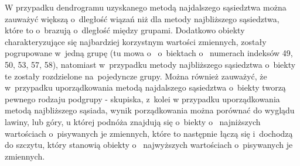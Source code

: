 \documentclass[12pt,a4paper]{report}
\begin{document}
{W przypadku dendrogramu uzyskanego metodą najdalszego sąsiedztwa można
zauważyć większą o~dległość wiązań niż dla metody najbliższego
sąsiedztwa, które to o~brazują o~dległość między grupami. Dodatkowo
obiekty charakteryzujące się najbardziej korzystnym wartości zmiennych,
zostały pogrupowane w~jedną grupę (tu mowa o~ o~biektach o~ numerach
indeksów 49, 50, 53, 57, 58), natomiast w~przypadku metody najbliższego
sąsiedztwa o~biekty te zostały rozdzielone na~pojedyncze grupy. Można
również zauważyć, że w~przypadku uporządkowania metodą najdalszego
sąsiedztwa o~biekty tworzą pewnego rodzaju podgrupy - skupiska, z~kolei w
przypadku uporządkowania metodą najbliższego sąsiada, wynik
porządkowania można porównać do wyglądu lawiny, lub góry, u której
podnóża znajdują się o~biekty o~ najniższych wartościach o~pisywanych je
zmiennych, które to następnie łączą się i~dochodzą do szczytu, który stanowią
obiekty o~ najwyższych wartościach o~pisywanych je zmiennych.

}
\end{document}
